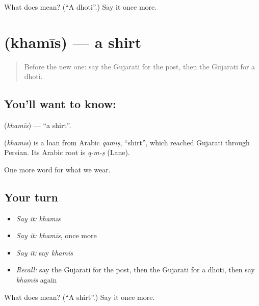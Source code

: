 \begin{tcolorbox}[breakable,colback=teal!4,colframe=teal!35!black,title={Before you move on}]
What does  mean? (\textquotedblleft{}A dhoti\textquotedblright{}.) Say it once more.
\end{tcolorbox}
\section[\texorpdfstring{\gu{ખમીસ} (khamīs)}{ખમીસ (khamīs)}]{ (khamīs) — a shirt}

\label{lesson:GU-C87-shirt}



\begin{quote}
Before the new one: say the Gujarati for the post, then the Gujarati for a dhoti.
\end{quote}

\subsection*{You'll want to know: }
\textbf{} (\emph{khamīs}) — \textquotedblleft{}a shirt\textquotedblright{}.

\begin{cousinweb}
\textbf{} (\emph{khamīs}) is a loan from Arabic \emph{qamīṣ}, \textquotedblleft{}shirt\textquotedblright{}, which reached Gujarati through Persian. Its Arabic root is \emph{q-m-ṣ} (Lane).
\end{cousinweb}

\begin{grammarlens}[title={What you've built}]
One more word for what we wear.
\end{grammarlens}

\subsection*{Your turn}
\begin{itemize}
\raggedright
  \item \emph{Say it:} \emph{khamīs}
  \item \emph{Say it:} \emph{khamīs}, once more
  \item \emph{Say it:} say \emph{khamīs}
  \item \emph{Recall:} say the Gujarati for the post, then the Gujarati for a dhoti, then say \emph{khamīs} again
\end{itemize}

\begin{tcolorbox}[breakable,colback=teal!4,colframe=teal!35!black,title={Before you move on}]
What does  mean? (\textquotedblleft{}A shirt\textquotedblright{}.) Say it once more.
\end{tcolorbox}
